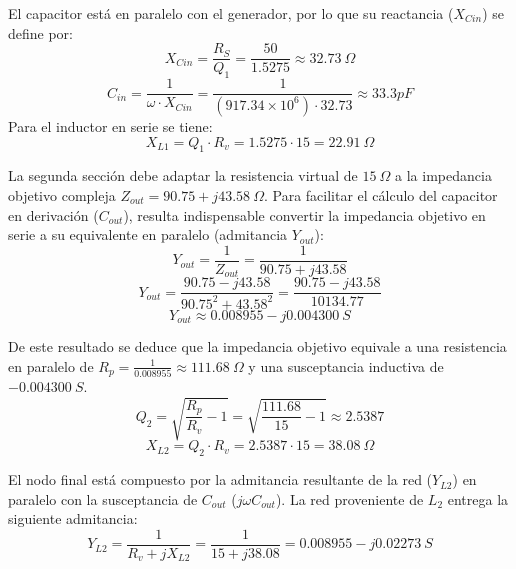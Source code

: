 \documentclass[11pt,a4paper,twoside]{report}
\begin{document}
	El capacitor está en paralelo con el generador, por lo que su reactancia ($X_{Cin}$) se define por:
	\begin{equation}
		X_{Cin} = \frac{R_S}{Q_1} = \frac{50}{1.5275} \approx 32.73 \ \Omega
	\end{equation}
	\begin{equation}
		C_{in} = \frac{1}{\omega \cdot X_{Cin}} = \frac{1}{(917.34 \times 10^6) \cdot 32.73} \approx 33.3 pF
	\end{equation}
	Para el inductor en serie se tiene:
	\begin{equation}
		X_{L1} = Q_1 \cdot R_v = 1.5275 \cdot 15 = 22.91 \ \Omega
	\end{equation}
	
	La segunda sección debe adaptar la resistencia virtual de $15 \ \Omega$ a la impedancia objetivo compleja $Z_{out} = 90.75 + j43.58 \ \Omega$. Para facilitar el cálculo del capacitor en derivación ($C_{out}$), resulta indispensable convertir la impedancia objetivo en serie a su equivalente en paralelo (admitancia $Y_{out}$):
	\begin{equation}
		Y_{out} = \frac{1}{Z_{out}} = \frac{1}{90.75 + j43.58}
	\end{equation}
	\begin{equation}
		Y_{out} = \frac{90.75 - j43.58}{90.75^2 + 43.58^2} = \frac{90.75 - j43.58}{10134.77}
	\end{equation}
	\begin{equation}
		Y_{out} \approx 0.008955 - j0.004300 \ S
	\end{equation}
	
	De este resultado se deduce que la impedancia objetivo equivale a una resistencia en paralelo de $R_p = \frac{1}{0.008955} \approx 111.68 \ \Omega$ y una susceptancia inductiva de $-0.004300 \ S$.
	\begin{equation}
		Q_2 = \sqrt{\frac{R_p}{R_v} - 1} = \sqrt{\frac{111.68}{15} - 1} \approx 2.5387
	\end{equation}
	\begin{equation}
		X_{L2} = Q_2 \cdot R_v = 2.5387 \cdot 15 = 38.08 \ \Omega
	\end{equation}
	
	El nodo final está compuesto por la admitancia resultante de la red ($Y_{L2}$) en paralelo con la susceptancia de $C_{out}$ ($j\omega C_{out}$). La red proveniente de $L_2$ entrega la siguiente admitancia:
	\begin{equation}
		Y_{L2} = \frac{1}{R_v + jX_{L2}} = \frac{1}{15 + j38.08} = 0.008955 - j0.02273 \ S
	\end{equation}\newpage
	
\end{document}
